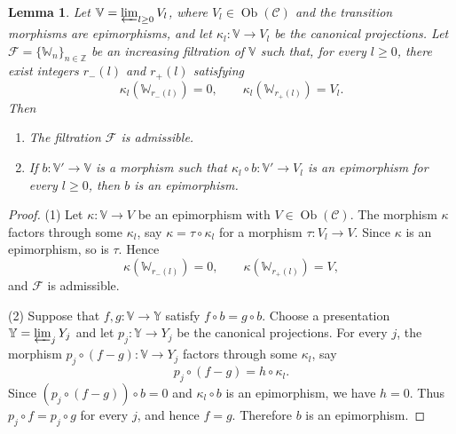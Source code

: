 \documentclass[11pt,a4paper,twoside]{amsart}
\newtheorem{lemma}[theorem]{Lemma}
\theoremstyle{definition}
\theoremstyle{remark}
\newcommand{\mV}{\mathbb V}
\newcommand{\mW}{\mathbb W}
\newcommand{\mY}{\mathbb Y}
\newcommand{\kk}{\kappa}
\newcommand{\mcC}{\mathcal C}
\newcommand{\mcF}{\mathcal F}
\newcommand{\ZZ}{\mathbb Z}
\begin{document}
\begin{lemma}\label{admi}
Let $\mV=\varprojlim_{l\geq0}V_l$, where $V_l\in\operatorname{Ob}(\mcC)$ and the transition morphisms are epimorphisms, and let $\kk_l:\mV\to V_l$ be the canonical projections. Let $\mcF=\{\mW_n\}_{n\in\ZZ}$ be an increasing filtration of $\mV$ such that, for every $l\geq0$, there exist integers $r_-(l)$ and $r_+(l)$ satisfying
$$
\kk_l(\mW_{r_-(l)})=0,\qquad \kk_l(\mW_{r_+(l)})=V_l.
$$
Then
\begin{enumerate}
\item The filtration $\mcF$ is admissible.
\item If $b:\mV'\to\mV$ is a morphism such that $\kk_l\circ b:\mV'\to V_l$ is an epimorphism for every $l\geq0$, then $b$ is an epimorphism.
\end{enumerate}
\end{lemma}
\begin{proof}
(1) Let $\kk:\mV\to V$ be an epimorphism with $V\in\operatorname{Ob}(\mcC)$. The morphism $\kk$ factors through some $\kk_l$, say $\kk=\tau\circ\kk_l$ for a morphism $\tau:V_l\to V$. Since $\kk$ is an epimorphism, so is $\tau$. Hence
$$
\kk(\mW_{r_-(l)})=0,\qquad \kk(\mW_{r_+(l)})=V,
$$
and $\mcF$ is admissible.

(2) Suppose that $f,g:\mV\to\mY$ satisfy $f\circ b=g\circ b$. Choose a presentation $\mY=\varprojlim_jY_j$ and let $p_j:\mY\to Y_j$ be the canonical projections. For every $j$, the morphism $p_j\circ(f-g):\mV\to Y_j$ factors through some $\kk_l$, say
$$
p_j\circ(f-g)=h\circ\kk_l.
$$
Since $(p_j\circ(f-g))\circ b=0$ and $\kk_l\circ b$ is an epimorphism, we have $h=0$. Thus $p_j\circ f=p_j\circ g$ for every $j$, and hence $f=g$. Therefore $b$ is an epimorphism.
\end{proof}
\end{document}
